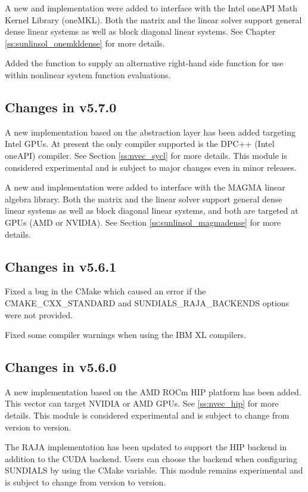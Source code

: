A new {\sunmatrix} and {\sunlinsol} implementation were added to interface with
the Intel oneAPI Math Kernel Library (oneMKL). Both the matrix and the linear
solver support general dense linear systems as well as block diagonal linear
systems. See Chapter \ref{ss:sunlinsol_onemkldense} for more details.

Added the function  to supply an alternative right-hand
side function for use within nonlinear system function evaluations.

\subsection*{Changes in v5.7.0}

A new {\nvector} implementation based on the {\sycl} abstraction layer has been
added targeting Intel GPUs. At present the only {\sycl} compiler supported is
the DPC++ (Intel oneAPI) compiler. See Section \ref{ss:nvec_sycl} for more
details. This module is considered experimental and is subject to major changes
even in minor releases.

A new {\sunmatrix} and {\sunlinsol} implementation were added to interface
with the MAGMA linear algebra library. Both the matrix and the linear solver
support general dense linear systems as well as block diagonal linear systems,
and both are targeted at GPUs (AMD or NVIDIA). See Section \ref{ss:sunlinsol_magmadense}
for more details.

\subsection*{Changes in v5.6.1}

Fixed a bug in the {\sundials} CMake which caused an error
if the CMAKE\_CXX\_STANDARD and SUNDIALS\_RAJA\_BACKENDS options
were not provided.

Fixed some compiler warnings when using the IBM XL compilers.

\subsection*{Changes in v5.6.0}

A new {\nvector} implementation based on the AMD ROCm HIP platform has been
added. This vector can target NVIDIA or AMD GPUs. See \ref{ss:nvec_hip} for more
details. This module is considered experimental and is subject to change from
version to version.

The RAJA {\nvector} implementation has been updated to support the HIP backend
in addition to the CUDA backend. Users can choose the backend when configuring
SUNDIALS by using the  CMake variable. This module
remains experimental and is subject to change from version to version.

